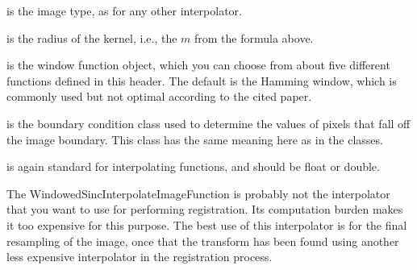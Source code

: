 
 is the image type, as for any other interpolator.

 is the radius of the kernel, i.e., the $m$ from the
formula above.

 is the window function object, which you can choose from
about five different functions defined in this header. The default is the
Hamming window, which is commonly used but not optimal according to the cited
paper.

 is the boundary condition class used to determine the
values of pixels that fall off the image boundary. This class has the same
meaning here as in the  classes.

 is again standard for interpolating functions, and should be
float or double.


The WindowedSincInterpolateImageFunction is probably not the interpolator that
you want to use for performing registration. Its computation burden makes it
too expensive for this purpose. The best use of this interpolator is for the
final resampling of the image, once that the transform has been found using
another less expensive interpolator in the registration process.


